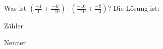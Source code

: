 \documentclass{ximera}
\begin{document}
\begin{shuffle}
\begin{question}
Was ist $(\frac{-1}{1}+\frac{-6}{-10})\cdot(\frac{-10}{-10}+\frac{-9}{-4})$?
Die Lösung ist:
\begin{solution}
Zähler 
\end{solution}
\begin{solution}
Nenner 
\end{solution}
\end{question}

\end{shuffle}
\end{document}
